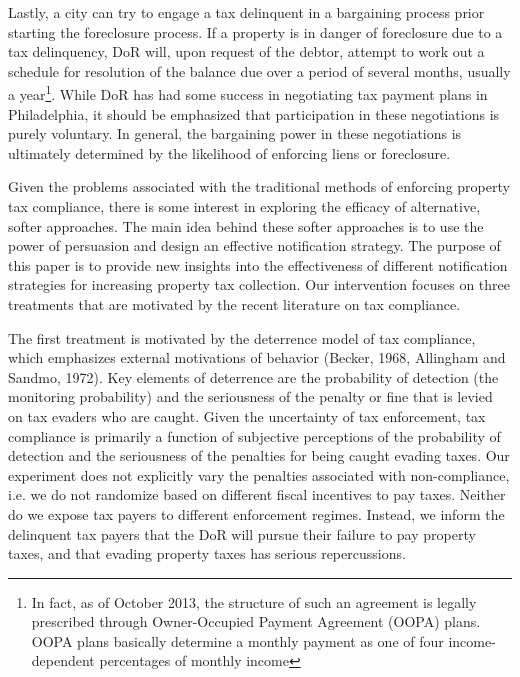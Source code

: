 \documentclass[12pt,titlepage]{article}
\begin{document}
Lastly, a city can try to engage a tax delinquent in a bargaining
process prior starting the foreclosure process. If a property is in
danger of foreclosure due to a tax delinquency, DoR will, upon
request of the debtor, attempt to work out a schedule for resolution
of the balance due over a period of several months, usually a
year\footnote{In fact, as of October 2013, the structure of such an
agreement is legally prescribed through Owner-Occupied Payment
Agreement (OOPA) plans. OOPA plans basically determine a monthly 
payment as one of four income-dependent percentages of monthly income}. While DoR has
had some success in negotiating tax payment plans in Philadelphia, it
should be emphasized that participation in these negotiations is
purely voluntary. In general, the bargaining power in these negotiations is
ultimately determined by the likelihood of enforcing liens or foreclosure.

Given the problems associated with the traditional methods of
enforcing property tax compliance, there is some interest in exploring
the efficacy of alternative, softer approaches. The main idea behind these softer
approaches is to use the power of persuasion and design an effective
notification strategy. The purpose of this paper is to provide new
insights into the effectiveness of different notification strategies
for increasing property tax collection. Our intervention focuses on
three treatments that are motivated by the recent literature on tax
compliance.

The first treatment is motivated by the deterrence model of tax
compliance, which emphasizes external motivations of behavior (Becker,
1968, Allingham and Sandmo, 1972). Key elements of deterrence are the
probability of detection (the monitoring probability) and the
seriousness of the penalty or fine that is levied on tax evaders who
are caught.  Given the uncertainty of tax enforcement, tax compliance
is primarily a function of subjective perceptions of the probability
of detection and the seriousness of the penalties for being caught
evading taxes. Our experiment does not explicitly vary the penalties
associated with non-compliance, i.e. we do not randomize based on
different fiscal incentives to pay taxes.  Neither do we expose tax
payers to different enforcement regimes.  Instead, we inform the
delinquent tax payers that the DoR will pursue their failure to
pay property taxes, and that evading property taxes has serious
repercussions.
\end{document}
